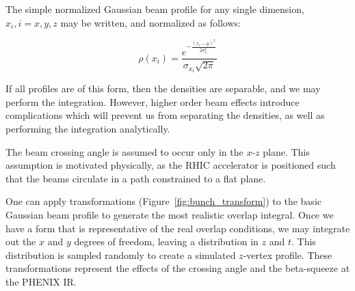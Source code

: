 The simple normalized Gaussian beam profile for any single dimension, $x_i, i=x,
y, z$  may be written, and normalized as follows:

\begin{equation}
\label{eq:simplegaussian}
\rho(x_{i}) = \frac{e^{ -\frac{(x_{i}-\mu)^2}{2\sigma_{x_i}^2}}}{\sigma_{x_i}\sqrt{2\pi}}
\end{equation}

{\noindent}If all profiles are of this form, then the densities are separable,
and we may perform the integration. However, higher order beam effects introduce
complications which will prevent us from separating the densities, as well as
performing the integration analytically.

The beam crossing angle is assumed to occur only in the $x$-$z$ plane. This
assumption is motivated physically, as the RHIC accelerator is positioned such
that the beams circulate in a path constrained to a flat plane. 

One can apply transformations (Figure~\ref{fig:bunch_transform}) to the basic
Gaussian beam profile to generate the most realistic overlap integral. Once we
have a form that is representative of the real overlap conditions, we may
integrate out the $x$ and $y$ degrees of freedom, leaving a distribution in $z$
and $t$. This distribution is sampled randomly to create a simulated $z$-vertex
profile. These transformations represent the effects of the crossing angle and
the beta-squeeze at the PHENIX IR.


